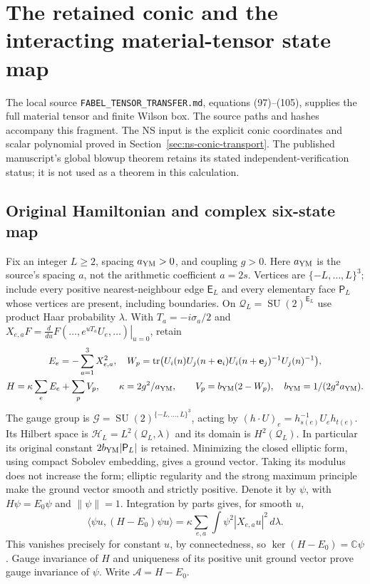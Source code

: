 \section{The retained conic and the interacting material-tensor state map}
\label{sec:ym-retained-composition}

The local source \texttt{FABEL\_TENSOR\_TRANSFER.md}, equations
(97)--(105), supplies the full material tensor and finite Wilson box.
The source paths and hashes accompany this fragment. The NS input
is the explicit conic coordinates and scalar polynomial proved in
Section~\ref{sec:ns-conic-transport}. The published manuscript's
global blowup theorem retains its stated independent-verification
status; it is not used as a theorem in this calculation.

\subsection{Original Hamiltonian and complex six-state map}

Fix an integer $L\ge2$, spacing $a_{\rm YM}>0$, and coupling $g>0$.
Here $a_{\rm YM}$ is the source's spacing $a$, not the arithmetic
coefficient $a=2s$. Vertices are $\{-L,\ldots,L\}^3$; include every
positive nearest-neighbour edge $\mathsf E_L$ and every elementary
face $\mathsf P_L$ whose vertices are present, including boundaries.
On $\mathcal Q_L=\operatorname{SU}(2)^{\mathsf E_L}$ use product
Haar probability $\lambda$. With $T_a=-i\sigma_a/2$ and
$X_{e,a}F=\left.\frac{d}{du}F(\ldots,e^{uT_a}U_e,\ldots)\right|_{u=0}$,
retain
\begin{gather*}
 E_e=-\sum_{a=1}^3X_{e,a}^2,\quad
 W_p=\operatorname{tr}\bigl(U_i(n)U_j(n+\mathbf e_i)
 U_i(n+\mathbf e_j)^{-1}U_j(n)^{-1}\bigr),\\
 H=\kappa\sum_eE_e+\sum_pV_p,\qquad
 \kappa=2g^2/a_{\rm YM},\qquad
 V_p=b_{\rm YM}(2-W_p),\quad b_{\rm YM}=1/(2g^2a_{\rm YM}).
\end{gather*}
The gauge group is
$\mathcal G=\operatorname{SU}(2)^{\{-L,\ldots,L\}^3}$, acting by
$(h\cdot U)_e=h_{s(e)}^{-1}U_eh_{t(e)}$.
Its Hilbert space is $\mathscr H_L=L^2(\mathcal Q_L,\lambda)$
and its domain is $H^2(\mathcal Q_L)$. In particular its original
constant $2b_{\rm YM}|\mathsf P_L|$ is retained. Minimizing the
closed elliptic form, using compact Sobolev embedding, gives a
ground vector. Taking its modulus does not increase the form;
elliptic regularity and the strong maximum principle make the
ground vector smooth and strictly positive. Denote it by $\psi$,
with $H\psi=E_0\psi$ and $\|\psi\|=1$.
Integration by parts gives, for smooth $u$,
\[
 \langle\psi u,(H-E_0)\psi u\rangle
 =\kappa\sum_{e,a}\int\psi^2|X_{e,a}u|^2\,d\lambda .
\]
This vanishes precisely for constant $u$, by connectedness, so
$\ker(H-E_0)=\mathbb C\psi$. Gauge invariance of $H$ and uniqueness
of its positive unit ground vector prove gauge invariance of $\psi$.
Write $\mathcal A=H-E_0$.

